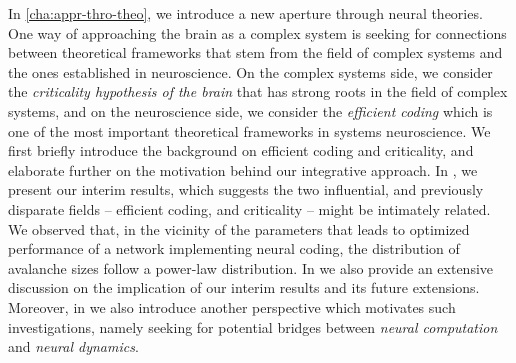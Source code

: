 In \autoref{cha:appr-thro-theo}, we introduce a new aperture through neural theories.
One way of approaching the brain as a complex system is seeking for connections between theoretical frameworks that stem from the field of complex systems and the ones established in neuroscience.
On the complex systems side, we consider the \emph{criticality hypothesis of the brain} that has strong roots in the field of complex systems, and on the neuroscience side, we consider the \emph{efficient coding} which is one of the most important theoretical frameworks in systems neuroscience.
We first briefly introduce the background on efficient coding and criticality,
and elaborate further on the motivation behind our integrative approach.
In , we present our interim results,
which suggests the two influential, and previously disparate fields -- efficient coding, and criticality -- might be intimately related.
We observed that, in the vicinity of the parameters that leads to optimized performance of a network implementing neural coding,
the distribution of avalanche sizes follow a power-law distribution.
In  we also provide an extensive discussion on the implication of our interim results and its future extensions.
Moreover, in  we also introduce another perspective which motivates such investigations,
namely seeking for potential bridges between \emph{neural computation} and \emph{neural dynamics}.

